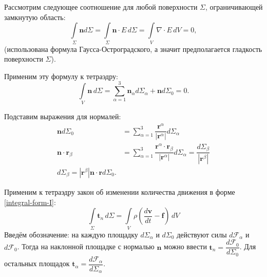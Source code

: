Рассмотрим следующее соотношение для 
любой поверхности $\Sigma$, ограничивающей замкнутую область:
\[
  \int\limits_\Sigma \mathbf{n} d\Sigma
  = \int\limits_\Sigma \mathbf{n} \cdot E \, d\Sigma
  = \int\limits_V \nabla \cdot E \, dV
  = 0,
\]
(использована формула Гаусса-Остроградского, а значит предполагается гладкость 
поверхности $\Sigma$).

Применим эту формулу к тетраэдру:
\[
  \int\limits_V \mathbf{n} \, d\Sigma
  = \sum_{\alpha=1}^3 \mathbf{n}_\alpha d\Sigma_\alpha + \mathbf{n} d\Sigma_0
  = 0.
\]

Подставим выражения для нормалей:
\begin{align*}
  \mathbf{n} d\Sigma_0
  &= \sum_{\alpha=1}^3 \dfrac{\mathbf{r}^\alpha}{|\mathbf{r}^\alpha|} d\Sigma_\alpha \\
  \mathbf{n} \cdot \mathbf{r}_\beta
  &= \sum_{\alpha=1}^3 \dfrac{\mathbf{r}^\alpha\cdot\mathbf{r}_\beta}{|\mathbf{r}^\alpha|} d\Sigma_\alpha
  = \dfrac{d\Sigma_\beta}{|\mathbf{r}^\beta|} \\
  d\Sigma_\beta = |\mathbf{r}^\beta| \mathbf{n} \cdot \mathbf{r} d\Sigma_0.
\end{align*}

Применим к тетраэдру закон об изменении количества движения в форме
\eqref{integral-form-I}:
\[
  \int\limits_\Sigma \mathbf{t}_n \, d\Sigma
  = \int\limits_V \rho \left( \dfrac{d\mathbf{v}}{dt} - \mathbf{f} \right) \, dV
\]
Введём обозначение: на каждую площадку $d\Sigma_\alpha$ и $d\Sigma_0$
действуют силы $d\mathbf{\mathcal{F}}_\alpha$ и $d\mathbf{\mathcal{F}}_0$.
Тогда на наклонной площадке с нормалью $\mathbf{n}$ можно ввести 
$\mathbf{t}_n = \dfrac{d\mathbf{\mathcal{F}}_0}{d\Sigma_0}$. Для остальных
площадок $\mathbf{t}_\alpha = \dfrac{d\mathbf{\mathcal{F}}_\alpha}{d\Sigma_\alpha}$.

